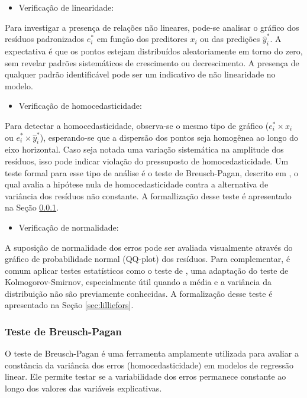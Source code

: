 \documentclass[12pt,a4paper,header]{abnt}
\begin{document}
\begin{itemize}
    \item[\textbf{•}]Verificação de linearidade:
\end{itemize}
Para investigar a presença de relações não lineares, pode-se analisar o gráfico dos resíduos padronizados $e_i^*$ em função dos preditores $x_i$ ou das predições $\hat{y}_i^*$. A expectativa é que os pontos estejam distribuídos aleatoriamente em torno do zero, sem revelar padrões sistemáticos de crescimento ou decrescimento. A presença de qualquer padrão identificável pode ser um indicativo de não linearidade no modelo.

\begin{itemize}
    \item[\textbf{•}]Verificação de homocedasticidade:
\end{itemize}
Para detectar a homocedasticidade, observa-se o mesmo tipo de gráfico ($e_i^* \times x_i$ ou $e_i^* \times \hat{y}_i^*$), esperando-se que a dispersão dos pontos seja homogênea ao longo do eixo horizontal. Caso seja notada uma variação sistemática na amplitude dos resíduos, isso pode indicar violação do pressuposto de homocedasticidade. Um teste formal para esse tipo de análise é o teste de Breusch-Pagan, descrito em , o qual avalia a hipótese nula de homocedasticidade contra a alternativa de variância dos resíduos não constante. A formallização desse teste é apresentado na Seção \ref{sec:breusch}.

\begin{itemize}
    \item[\textbf{•}]Verificação de normalidade:
\end{itemize}
A suposição de normalidade dos erros pode ser avaliada visualmente através do gráfico de probabilidade normal (QQ-plot) dos resíduos. Para complementar, é comum aplicar testes estatísticos como o teste de , uma adaptação do teste de Kolmogorov-Smirnov, especialmente útil quando a média e a variância da distribuição não são previamente conhecidas. A formalização desse teste é apresentado na Seção \ref{sec:lilliefors}.


\subsubsection{Teste de Breusch-Pagan} \label{sec:breusch}
O teste de Breusch-Pagan é uma ferramenta amplamente utilizada para avaliar a constância da variância dos erros (homocedasticidade) em modelos de regressão linear. Ele permite testar se a variabilidade dos erros permanece constante ao longo dos valores das variáveis explicativas.
\end{document}
